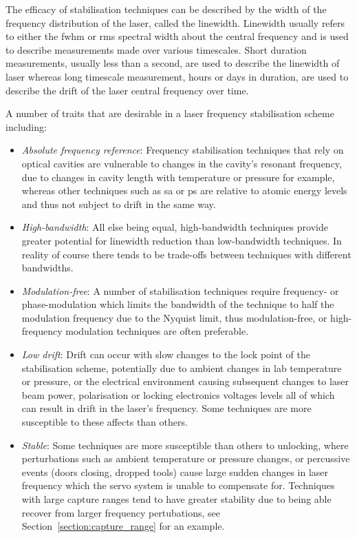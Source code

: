 The efficacy of stabilisation techniques can be described by the width of the frequency distribution of the laser, called the linewidth.
Linewidth usually refers to either the \gls{fwhm} or \gls{rms} spectral width about the central frequency and is used to describe measurements made over various timescales.
Short duration measurements, usually less than a second, are used to describe the linewidth of laser whereas long timescale measurement, hours or days in duration, are used to describe the drift of the laser central frequency over time.

A number of traits that are desirable in a laser frequency stabilisation scheme including:
\begin{itemize}
    \item \emph{Absolute frequency reference}: Frequency stabilisation techniques that rely on optical cavities are vulnerable to changes in the cavity's resonant frequency, due to changes in cavity length with temperature or pressure for example, whereas other techniques such as \gls{sa} or \gls{ps} are relative to atomic energy levels and thus not subject to drift in the same way.
    \item \emph{High-bandwidth}: All else being equal, high-bandwidth techniques provide greater potential for linewidth reduction than low-bandwidth techniques. In reality of course there tends to be trade-offs between techniques with different bandwidths.
    \item \emph{Modulation-free}: A number of stabilisation techniques require frequency- or phase-modulation which limits the bandwidth of the technique to half the modulation frequency due to the Nyquist limit, thus modulation-free, or high-frequency modulation techniques are often preferable.
    \item \emph{Low drift}: Drift can occur with slow changes to the lock point of the stabilisation scheme, potentially due to ambient changes in lab temperature or pressure, or the electrical environment causing subsequent changes to laser beam power, polarisation or locking electronics voltages levels all of which can result in drift in the laser's frequency. Some techniques are more susceptible to these affects than others.
    \item \emph{Stable}: Some techniques are more susceptible than others to unlocking, where perturbations such as ambient temperature or pressure changes, or percussive events (doors closing, dropped tools) cause large sudden changes in laser frequency which the servo system is unable to compensate for. Techniques with large capture ranges tend to have greater stability due to being able recover from larger frequency pertubations, see Section~\ref{section:capture_range} for an example.
\end{itemize}

